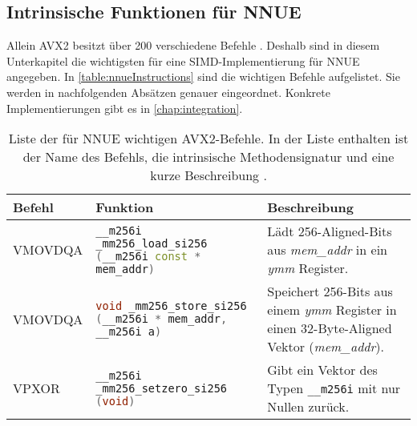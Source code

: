 \subsection{Intrinsische Funktionen für NNUE}
\label{chap:intrinsicsForNNUE}

Allein \ac{AVX2} besitzt über 200 verschiedene Befehle \cite{intelIntrinsics}. Deshalb sind in diesem Unterkapitel die wichtigsten für eine \ac{SIMD}-Implementierung für NNUE angegeben. In \autoref{table:nnueInstructions} sind die wichtigen Befehle aufgelistet. Sie werden in nachfolgenden Absätzen genauer eingeordnet. Konkrete Implementierungen gibt es in \autoref{chap:integration}.

\begin{table}[ht]
  \caption{Liste der für \ac{NNUE} wichtigen \ac{AVX2}-Befehle. In der Liste enthalten ist der Name des Befehls, die intrinsische Methodensignatur und eine kurze Beschreibung \cite{intelIntrinsics}.}
  \label{table:nnueInstructions}
  \renewcommand{\arraystretch}{1.2}
  \centering
  \sffamily
  \begin{footnotesize}
    \begin{tabularx}{\textwidth}{l X X}
      \toprule
      \textbf{Befehl} & \textbf{Funktion}                                                                                                                                                                                    & \textbf{Beschreibung} \\
      \midrule
      VMOVDQA         & \lstinline[language=C++]{__m256i _mm256_load_si256 (__m256i const * mem_addr)} & Lädt 256-Aligned-Bits aus \emph{mem\_addr} in ein \emph{ymm} Register.                                                                                                                                                                 \\
      VMOVDQA         & \lstinline[language=C++]{void _mm256_store_si256 (__m256i * mem_addr, __m256i a)} & Speichert 256-Bits aus einem \emph{ymm} Register in einen 32-Byte-Aligned Vektor (\emph{mem\_addr}).                                                                                                                                      \\
      VPXOR           & \lstinline[language=C++]{__m256i _mm256_setzero_si256 (void)} & Gibt ein Vektor des Typen \lstinline[language=C++]{__m256i} mit nur Nullen zurück.                                                                                                                                                                        \\

\end{tabularx}
\end{footnotesize}
\end{table}
